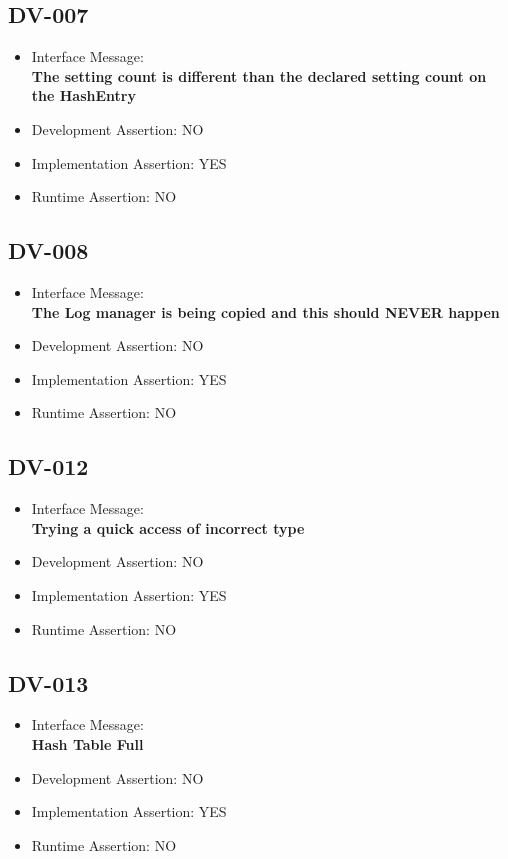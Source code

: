 \subsection{DV-007}
\begin{itemize}
  \item Interface Message:\\[1em]\textbf{The setting count is different than the declared setting count on the HashEntry}
  \item Development Assertion: NO
  \item Implementation Assertion: YES
  \item Runtime Assertion: NO
\end{itemize}

\subsection{DV-008}
\begin{itemize}
  \item Interface Message:\\[1em]\textbf{The Log manager is being copied and this should NEVER happen}
  \item Development Assertion: NO
  \item Implementation Assertion: YES
  \item Runtime Assertion: NO
\end{itemize}

\subsection{DV-012}
\begin{itemize}
  \item Interface Message:\\[1em]\textbf{Trying a quick access of incorrect type}
  \item Development Assertion: NO
  \item Implementation Assertion: YES
  \item Runtime Assertion: NO
\end{itemize}

\subsection{DV-013}
\begin{itemize}
  \item Interface Message:\\[1em]\textbf{Hash Table Full}
  \item Development Assertion: NO
  \item Implementation Assertion: YES
  \item Runtime Assertion: NO
\end{itemize}

